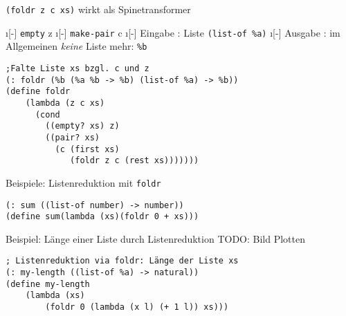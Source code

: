 \lstinline|(foldr z c xs)| wirkt als Spinetransformer
\begin{itemize}
	\i[-] \lstinline|empty| \eval z
	\i[-] \lstinline|make-pair| \eval c
	\i[-] Eingabe : Liste \lstinline|(list-of %a)|
	\i[-] Ausgabe : im Allgemeinen \emph{keine} Liste mehr: \lstinline|%b|
\end{itemize}
\begin{lstlisting}
;Falte Liste xs bzgl. c und z
(: foldr (%b (%a %b -> %b) (list-of %a) -> %b))
(define foldr
	(lambda (z c xs)
	  (cond 
	    ((empty? xs) z)
	    ((pair? xs)
	      (c (first xs)
	         (foldr z c (rest xs)))))))
\end{lstlisting}
Beispiele: Listenreduktion mit \lstinline|foldr|\\
\begin{lstlisting}
(: sum ((list-of number) -> number))
(define sum(lambda (xs)(foldr 0 + xs)))
\end{lstlisting}
Beispiel: Länge einer Liste durch Listenreduktion
TODO: Bild Plotten
\begin{lstlisting}
; Listenreduktion via foldr: Länge der Liste xs
(: my-length ((list-of %a) -> natural))
(define my-length
	(lambda (xs)
		(foldr 0 (lambda (x l) (+ 1 l)) xs)))
\end{lstlisting}
